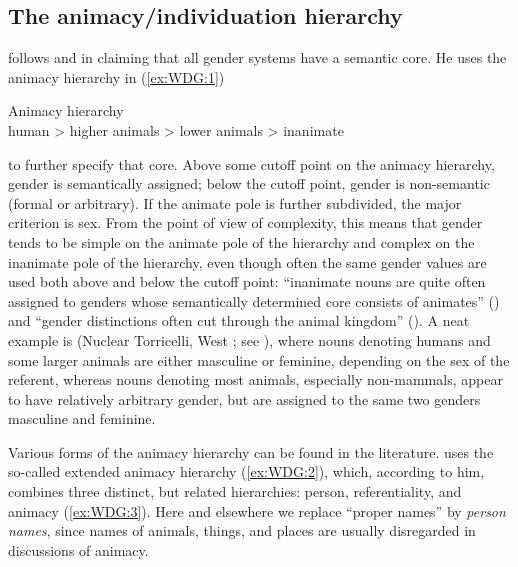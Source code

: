 \documentclass[output=collectionpaper]{langsci/langscibook}
\begin{document}
  \subsection{The animacy/individuation hierarchy}
\label{sec:WDG:3.2}

\cite{Dahl2000a} follows \cite{Aksenov1984} and \cite{Corbett1991} in claiming that all gender systems have a semantic core. He uses the animacy hierarchy in (\ref{ex:WDG:1})

\ea\label{ex:WDG:1}
Animacy hierarchy\\
human > higher animals > lower animals > inanimate\\
\z

\noindent to further specify that core. Above some cutoff point on the animacy hierarchy, gender is semantically assigned; below the cutoff point, gender is non-semantic (formal or arbitrary). If the animate pole is further subdivided, the major criterion is sex. From the point of view of complexity, this means that gender tends to be simple on the animate pole of the hierarchy and complex on the inanimate pole of the hierarchy, even though often the same gender values are used both above and below the cutoff point: ``inanimate nouns are quite often assigned to genders whose semantically determined core consists of animates'' (\citealt[102--103]{Dahl2000a}) and ``gender distinctions often cut through the animal kingdom'' (\citealt[100]{Dahl2000a}). A neat example is  (Nuclear Torricelli, West ; see ), where nouns denoting humans and some larger animals are either masculine or feminine, depending on the sex of the referent, whereas nouns denoting most animals, especially non-mammals, appear to have relatively arbitrary gender, but are assigned to the same two genders masculine and feminine.

Various forms of the animacy hierarchy can be found in the literature. \cite[130]{Croft2003} uses the so-called extended animacy hierarchy (\ref{ex:WDG:2}), which, according to him, combines three distinct, but related hierarchies: person, referentiality, and animacy (\ref{ex:WDG:3}). Here and elsewhere we replace ``proper names'' by \emph{person names}, since names of animals, things, and places are usually disregarded in discussions of animacy.

%
\end{document}
